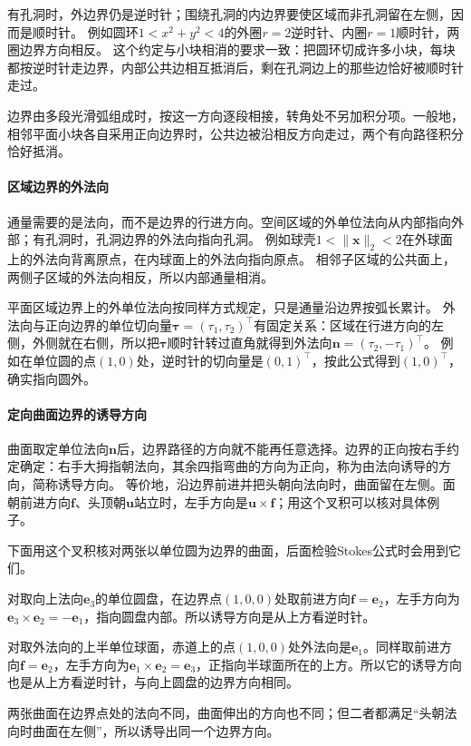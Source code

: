 有孔洞时，外边界仍是逆时针；围绕孔洞的内边界要使区域而非孔洞留在左侧，因而是顺时针。
例如圆环$1<x^2+y^2<4$的外圈$r=2$逆时针、内圈$r=1$顺时针，两圈边界方向相反。
这个约定与小块相消的要求一致：把圆环切成许多小块，每块都按逆时针走边界，内部公共边相互抵消后，剩在孔洞边上的那些边恰好被顺时针走过。

边界由多段光滑弧组成时，按这一方向逐段相接，转角处不另加积分项。一般地，相邻平面小块各自采用正向边界时，公共边被沿相反方向走过，两个有向路径积分恰好抵消。

\paragraph{区域边界的外法向}

通量需要的是法向，而不是边界的行进方向。空间区域的外单位法向从内部指向外部；有孔洞时，孔洞边界的外法向指向孔洞。
例如球壳$1<\lVert\bm x\rVert_2<2$在外球面上的外法向背离原点，在内球面上的外法向指向原点。
相邻子区域的公共面上，两侧子区域的外法向相反，所以内部通量相消。

平面区域边界上的外单位法向按同样方式规定，只是通量沿边界按弧长累计。
外法向与正向边界的单位切向量$\bm\tau=(\tau_1,\tau_2)^\top$有固定关系：区域在行进方向的左侧，外侧就在右侧，所以把$\bm\tau$顺时针转过直角就得到外法向$\bm n=(\tau_2,-\tau_1)^\top$。
例如在单位圆的点$(1,0)$处，逆时针的切向量是$(0,1)^\top$，按此公式得到$(1,0)^\top$，确实指向圆外。

\paragraph{定向曲面边界的诱导方向}

曲面取定单位法向$\bm n$后，边界路径的方向就不能再任意选择。边界的正向按右手约定确定：右手大拇指朝法向，其余四指弯曲的方向为正向，称为由法向诱导的方向，简称诱导方向。
等价地，沿边界前进并把头朝向法向时，曲面留在左侧。面朝前进方向$\bm f$、头顶朝$\bm u$站立时，左手方向是$\bm u\times\bm f$；用这个叉积可以核对具体例子。

下面用这个叉积核对两张以单位圆为边界的曲面，后面检验Stokes公式时会用到它们。
\begin{example}[向上圆盘与外向上半球面的诱导方向]
\label{ex:analysis-hemisphere-induced-orientation}
对取向上法向$\bm e_3$的单位圆盘，在边界点$(1,0,0)$处取前进方向$\bm f=\bm e_2$，左手方向为$\bm e_3\times\bm e_2=-\bm e_1$，指向圆盘内部。所以诱导方向是从上方看逆时针。

对取外法向的上半单位球面，赤道上的点$(1,0,0)$处外法向是$\bm e_1$。同样取前进方向$\bm f=\bm e_2$，左手方向为$\bm e_1\times\bm e_2=\bm e_3$，正指向半球面所在的上方。所以它的诱导方向也是从上方看逆时针，与向上圆盘的边界方向相同。
\end{example}
两张曲面在边界点处的法向不同，曲面伸出的方向也不同；但二者都满足“头朝法向时曲面在左侧”，所以诱导出同一个边界方向。

